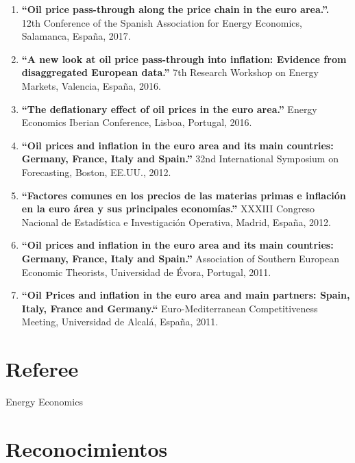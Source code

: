 \documentclass[11pt]{article}\usepackage[]{graphicx}\usepackage[]{color}
\begin{document}
\begin{enumerate}

\item \textbf{``Oil price pass-through along the price chain in the euro area.''.} 12th Conference of the Spanish Association for Energy Economics, Salamanca, España, 2017.

\item \textbf{``A new look at oil price pass-through into inflation: Evidence from disaggregated European data.''} 7th Research Workshop on Energy Markets, Valencia, España, 2016.

\item \textbf{``The deflationary effect of oil prices in the euro area.''} Energy Economics Iberian Conference, Lisboa, Portugal, 2016.

\item \textbf{``Oil prices and inflation in the euro area and its main countries: Germany, France, Italy and Spain.''} 32nd International Symposium on Forecasting, Boston, EE.UU., 2012.

\item \textbf{``Factores comunes en los precios de las materias primas e inflación en la euro área y sus principales economías.''} XXXIII Congreso Nacional de Estadística e Investigación Operativa, Madrid, España, 2012.

\item \textbf{``Oil prices and inflation in the euro area and its main countries: Germany, France, Italy and Spain.''} Association of Southern European Economic Theorists, Universidad de Évora, Portugal, 2011.

\item \textbf{``Oil Prices and inflation in the euro area and main partners: Spain, Italy, France and Germany.``} Euro-Mediterranean Competitiveness Meeting, Universidad de Alcalá, España, 2011.

\end{enumerate}


\section{Referee} 
Energy Economics

\section{Reconocimientos} 
\end{document}
